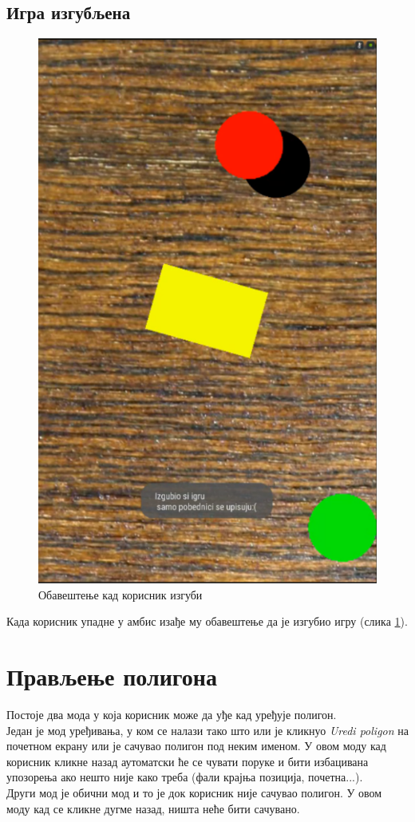 \subsection{Игра изгубљена}
\begin{figure}[htb!]
\begin{center}
\includegraphics[scale=.4]{pictures/game/gameLose}
\caption{Обавештење кад корисник изгуби}\label{fig:gameLose}
\end{center}
\end{figure}
Када корисник упадне у амбис изађе му обавештење да је изгубио игру (слика \ref{fig:gameLose}). 

\section{Прављење полигона}\label{UseCases:CreatePolygon}
Постоје два мода у која корисник може да уђе кад уређује полигон. 
\\ \indent Један је мод уређивања, у ком се налази тако што или је кликнуо \emph{Uredi poligon} на почетном екрану или је сачувао полигон под неким именом. У овом моду кад корисник кликне назад аутоматски ће се чувати поруке и бити избацивана упозорења ако нешто није како треба (фали крајња позиција, почетна...). 
\\ \indent Други мод је обични мод и то је док корисник није сачувао полигон. У овом моду кад се кликне дугме назад, ништа неће бити сачувано. 
